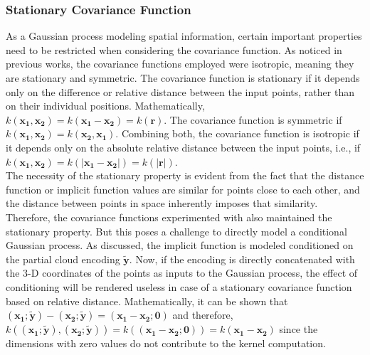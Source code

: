         \subsubsection{Stationary Covariance Function}
        As a Gaussian process modeling spatial information, certain important properties need to be restricted when considering the covariance function. As noticed in previous works, the covariance functions employed were isotropic, meaning they are stationary and symmetric. The covariance function is stationary if it depends only on the difference or relative distance between the input points, rather than on their individual positions. Mathematically, $k(\mathbf{x_1}, \mathbf{x_2}) = k(\mathbf{x_1} - \mathbf{x_2}) = k(\mathbf{r})$. The covariance function is symmetric if $k(\mathbf{x_1}, \mathbf{x_2}) = k(\mathbf{x_2}, \mathbf{x_1})$. Combining both, the covariance function is isotropic if it depends only on the absolute relative distance between the input points, i.e., if $k(\mathbf{x_1}, \mathbf{x_2}) = k(|\mathbf{x_1} - \mathbf{x_2}|) = k(|\mathbf{r}|)$.
        \\
        The necessity of the stationary property is evident from the fact that the distance function or implicit function values are similar for points close to each other, and the distance between points in space inherently imposes that similarity. Therefore, the covariance functions experimented with also maintained the stationary property. But this poses a challenge to directly model a conditional Gaussian process. As discussed, the implicit function is modeled conditioned on the partial cloud encoding $\mathbf{\tilde{y}}$. Now, if the encoding is directly concatenated with the 3-D coordinates of the points as inputs to the Gaussian process, the effect of conditioning will be rendered useless in case of a stationary covariance function based on relative distance. Mathematically, it can be shown that $(\mathbf{x_1}; \mathbf{\tilde{y}}) - (\mathbf{x_2}; \mathbf{\tilde{y}}) = (\mathbf{x_1}-\mathbf{x_2}; \mathbf{0})$ and therefore, $k((\mathbf{x_1}; \mathbf{\tilde{y}}),  (\mathbf{x_2}; \mathbf{\tilde{y}})) = k((\mathbf{x_1}-\mathbf{x_2}; \mathbf{0})) = k(\mathbf{x_1}-\mathbf{x_2})$ since the dimensions with zero values do not contribute to the kernel computation.
        \newline

